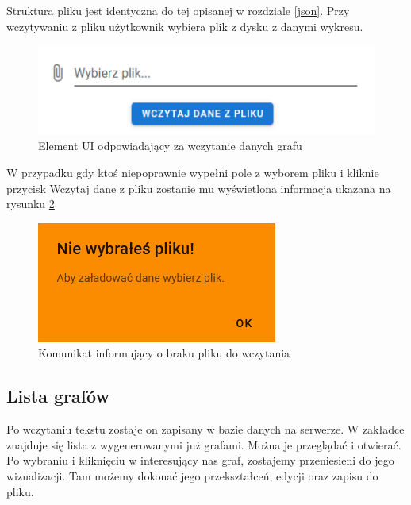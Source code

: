 \documentclass[12pt,a4paper]{article} %
\begin{document}
                Struktura pliku jest identyczna do tej opisanej w rozdziale \ref{json}. Przy wczytywaniu z pliku użytkownik wybiera plik z dysku z danymi wykresu.
                \begin{figure}[!h]
                    \center
                        \includegraphics[scale=1]{rys/wojtek/1.png}
                        \caption{Element UI odpowiadający za wczytanie danych grafu}
                        \label{UIloadFile}
                \end{figure}
                W przypadku gdy ktoś niepoprawnie wypełni pole z wyborem pliku i kliknie przycisk {Wczytaj dane z pliku} zostanie mu wyświetlona informacja ukazana na rysunku \ref{uidialog}
                
                \begin{figure}[!h]
                    \center
                        \includegraphics[scale=1]{rys/wojtek/2.png}
                        \caption{Komunikat informujący o braku pliku do wczytania}
                        \label{uidialog}
                \end{figure}
        
        \subsection{Lista grafów}
        Po wczytaniu tekstu zostaje on zapisany w bazie danych na serwerze. W zakładce znajduje się lista z wygenerowanymi już grafami. Można je przeglądać i otwierać. Po wybraniu i kliknięciu w interesujący nas graf, zostajemy przeniesieni do jego wizualizacji. Tam możemy dokonać jego przekształceń, edycji oraz zapisu do pliku.
        
\end{document}
